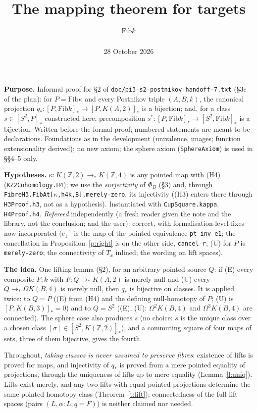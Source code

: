\documentclass[11pt]{amsart}
\title{The mapping theorem for targets $\Fib k$}
\date{28 October 2026}
\theoremstyle{definition}
\theoremstyle{remark}
\newcommand{\Om}{\Omega}
\newcommand{\Z}{\mathbb{Z}}
\newcommand{\code}[1]{\texttt{#1}}
\newcommand{\hc}[2]{[#1,#2]_*}
\newcommand{\Fib}{\mathrm{Fib}}
\newcommand{\cls}[1]{[#1]}
\begin{document}
\maketitle

\noindent\textbf{Purpose.} Informal proof for \S2 of
\code{doc/pi3-s2-postnikov-handoff-7.txt} (\S3c of the plan): for
$P=\Fib\kappa$ and every Postnikov triple $(A,B,k)$, the canonical
projection $q_*:\hc P{\Fib k}\to\hc P{K(A,2)}$ is a bijection; and,
for a class $s\in\hc{S^2}P$ constructed here, precomposition
$s^*:\hc P{\Fib k}\to\hc{S^2}{\Fib k}$ is a bijection. Written before the
formal proof; numbered statements are meant to be declarations.
Foundations as in the development (univalence, images; function
extensionality derived); no new axiom; the sphere axiom
(\code{SphereAxiom}) is used in \S\S4--5 only.

\smallskip\noindent\textbf{Hypotheses.} $\kappa:K(\Z,2)\to_*K(\Z,4)$ is
any pointed map with (H4) (\code{KZ2Cohomology.H4}); we use the
\emph{surjectivity} of $\Phi_B$ (\S3) and, through
\code{FibreH3.FibAt[$\kappa$,h4k,B].merely-zero}, its injectivity ((H3)
enters there through \code{H3Proof.h3}, not as a hypothesis).
Instantiated with \code{CupSquare.kappa}, \code{H4Proof.h4}.
\emph{Refereed} independently (a fresh reader given the note and the
library, not the conclusion; and the user): correct, with
formalisation-level fixes now incorporated ($e_1^{-1}$ is the map of the
pointed equivalence \code{pt-inv e1}; the cancellation in
Proposition~\ref{p:right} is on the other side, \code{cancel-r}; (U) for
$P$ is \code{merely-zero}; the connectivity of $T_x$ inlined; the wording
on lift spaces).

\smallskip\noindent\textbf{The idea.} One lifting lemma (\S2), for an
arbitrary pointed source $Q$: if (E) every composite $F;k$ with
$F:Q\to_*K(A,2)$ is merely null and (U) every $Q\to_*\Om K(B,4)$ is
merely null, then $q_*$ is bijective on classes. It is applied twice: to
$Q=P$ ((E) from (H4) and the defining null-homotopy of $P$; (U) is
$\hc P{K(B,3)}=0$) and to $Q=S^2$ ((E), (U): $\Om^2K(B,4)$ and $\Om^3K(B,4)$
are connected). The sphere case also produces $s$ (no choice: $s$ is the
unique class over a chosen class $\cls\sigma\in\hc{S^2}{K(\Z,2)}$), and a
commuting square of four maps of sets, three of them bijective, gives the
fourth.

Throughout, \emph{taking classes is never assumed to preserve fibres}:
existence of lifts is proved for maps, and injectivity of $q_*$ is proved
from a mere pointed equality of projections, through the uniqueness of
lifts up to mere equality (Lemma~\ref{l:uniq}). Lifts exist merely, and
any two lifts with equal pointed projections determine the same pointed
homotopy class (Theorem~\ref{t:lift}); connectedness of the full lift
spaces (pairs $(L,\alpha:L;q=F)$) is neither claimed nor needed.
\end{document}

